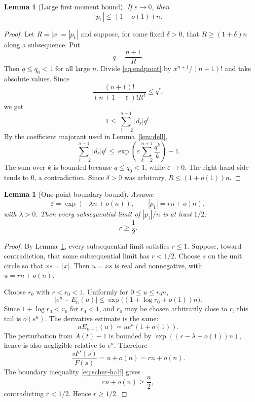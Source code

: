 \documentclass[11pt]{article}
\newtheorem{lemma}[theorem]{Lemma}
\newcommand{\eps}{\varepsilon}
\begin{document}
\begin{lemma}[Large first moment bound]\label{lem:largep1}
If $\eps\to0$, then
\[
        |p_1|\leq (1+o(1))n.
\]
\end{lemma}

\begin{proof}
Let $R=|x|=|p_1|$ and suppose, for some fixed $\delta>0$, that
$R\geq(1+\delta)n$ along a subsequence.  Put
\[
        q=\frac{n+1}{R}.
\]
Then $q\leq q_0<1$ for all large $n$.  Divide \eqref{eq:endpoint} by
$x^{n+1}/(n+1)!$ and take absolute values.  Since
\[
        \frac{(n+1)!}{(n+1-\ell)!R^\ell}\leq q^\ell,
\]
we get
\[
        1\leq \sum_{\ell=2}^{n+1}|d_\ell|q^\ell .
\]
By the coefficient majorant used in Lemma~\ref{lem:dell},
\[
        \sum_{\ell=2}^{n+1}|d_\ell|q^\ell
        \leq
        \exp\!\left(\eps\sum_{k=2}^{n+1}\frac{q^k}{k}\right)-1.
\]
The sum over $k$ is bounded because $q\le q_0<1$, while $\eps\to0$.
The right-hand side tends to $0$, a contradiction.  Since $\delta>0$ was
arbitrary, $R\leq (1+o(1))n$.
\end{proof}

\begin{lemma}[One-point boundary bound]\label{lem:onepoint}
Assume
\[
        \eps=\exp(-\lambda n+o(n)),
        \qquad |p_1|=rn+o(n),
\]
with \(\lambda>0\). Then every subsequential limit of \(|p_1|/n\) is at
least \(1/2\):
\[
        r\geq \frac12 .
        \tag{2.3}\label{eq:onepoint}
\]
\end{lemma}

\begin{proof}
By Lemma~\ref{lem:largep1}, every subsequential limit satisfies \(r\leq1\).
Suppose, toward contradiction, that some subsequential limit has \(r<1/2\).
Choose \(s\) on the unit circle so that \(xs=|x|\). Then \(u=xs\) is real and
nonnegative, with \(u=rn+o(n)\).

Choose \(r_0\) with \(r<r_0<1\). Uniformly for \(0\leq u\leq r_0n\),
\[
        |e^u-E_n(u)|\leq \exp\bigl((1+\log r_0+o(1))n\bigr).
\]
Since \(1+\log r_0<r_0\) for \(r_0<1\), and \(r_0\) may be chosen
arbitrarily close to \(r\), this tail is \(o(e^u)\). The derivative estimate
is the same:
\[
        uE_{n-1}(u)=ue^u(1+o(1)).
\]
The perturbation from \(A(t)-1\) is bounded by \(\exp((r-\lambda+o(1))n)\),
hence is also negligible relative to \(e^u\). Therefore
\[
        \frac{sF'(s)}{F(s)}=u+o(n)=rn+o(n).
\]
The boundary inequality \eqref{eq:schur-half} gives
\[
        rn+o(n)\geq \frac n2,
\]
contradicting \(r<1/2\). Hence \(r\geq1/2\).
\end{proof}
\end{document}
